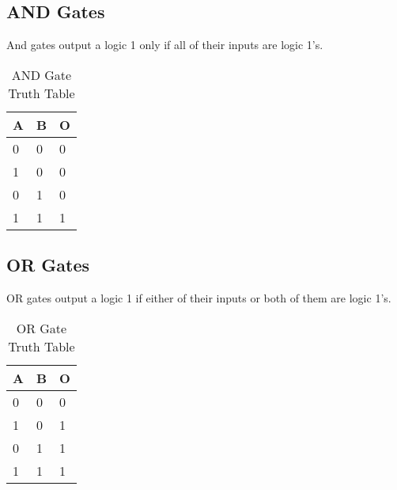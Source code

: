 \documentclass[11pt]{informatics-report}
\begin{document}
\subsection{AND Gates}
And gates output a logic 1 only if all of their inputs are logic 1's.
\begin{table}[h]
\centering
\begin{tabular}{l|l|l}
\hline
\multicolumn{1}{|l|}{\textbf{A}} & \textbf{B} & \multicolumn{1}{l|}{\textbf{O}} \\ \hline
0                                & 0          & 0                               \\
1                                & 0          & 0                               \\
0                                & 1          & 0                               \\
1                                & 1          & 1
\end{tabular}
\caption{AND Gate Truth Table}
\label{tab:and-table}
\end{table}

\subsection{OR Gates}
OR gates output a logic 1 if either of their inputs or both of them are logic 1's.
\begin{table}[h]
\centering
\begin{tabular}{l|l|l}
\hline
\multicolumn{1}{|l|}{\textbf{A}} & \textbf{B} & \multicolumn{1}{l|}{\textbf{O}} \\ \hline
0                                & 0          & 0                               \\
1                                & 0          & 1                               \\
0                                & 1          & 1                               \\
1                                & 1          & 1
\end{tabular}
\caption{OR Gate Truth Table}
\label{tab:or-table}
\end{table}
\end{document}
